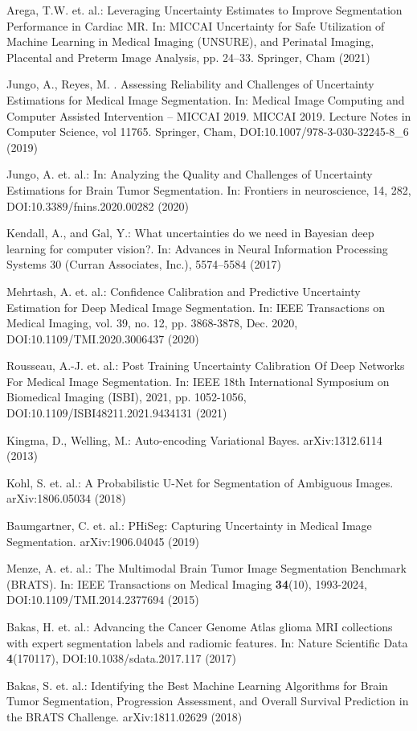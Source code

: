 \documentclass[runningheads]{llncs}
\begin{document}
\begin{thebibliography}{8}
Arega, T.W. et. al.: Leveraging Uncertainty Estimates to Improve Segmentation Performance in Cardiac MR. In: MICCAI Uncertainty for Safe Utilization of Machine Learning in Medical Imaging (UNSURE), and Perinatal Imaging, Placental and Preterm Image Analysis, pp. 24--33. Springer, Cham (2021)

Jungo, A., Reyes, M. . Assessing Reliability and Challenges of Uncertainty Estimations for Medical Image Segmentation. In: Medical Image Computing and Computer Assisted Intervention – MICCAI 2019. MICCAI 2019. Lecture Notes in Computer Science, vol 11765. Springer, Cham, DOI:10.1007/978-3-030-32245-8\_6 (2019)

Jungo, A. et. al.: In: Analyzing the Quality and Challenges of Uncertainty Estimations for Brain Tumor Segmentation. In: Frontiers in neuroscience, 14, 282, DOI:10.3389/fnins.2020.00282 (2020)

Kendall, A., and Gal, Y.: What uncertainties do we need in Bayesian deep
learning for computer vision?. In: Advances in Neural Information Processing
Systems 30 (Curran Associates, Inc.), 5574–5584 (2017)

Mehrtash, A. et. al.: Confidence Calibration and Predictive Uncertainty Estimation for Deep Medical Image Segmentation. In: IEEE Transactions on Medical Imaging, vol. 39, no. 12, pp. 3868-3878, Dec. 2020, DOI:10.1109/TMI.2020.3006437 (2020)

Rousseau, A.-J. et. al.: Post Training Uncertainty Calibration Of Deep Networks For Medical Image Segmentation. In: IEEE 18th International Symposium on Biomedical Imaging (ISBI), 2021, pp. 1052-1056, DOI:10.1109/ISBI48211.2021.9434131 (2021)

Kingma, D., Welling, M.: Auto-encoding Variational Bayes. arXiv:1312.6114 (2013)

Kohl, S. et. al.: A Probabilistic U-Net for Segmentation of Ambiguous Images. arXiv:1806.05034 (2018) 

Baumgartner, C. et. al.: PHiSeg: Capturing Uncertainty in Medical Image Segmentation. arXiv:1906.04045 (2019)

Menze, A. et. al.: The Multimodal Brain Tumor Image Segmentation Benchmark (BRATS). In: IEEE Transactions on Medical Imaging \textbf{34}(10), 1993-2024, DOI:10.1109/TMI.2014.2377694 (2015)

Bakas, H. et. al.: Advancing the Cancer Genome Atlas glioma MRI collections with expert segmentation labels and radiomic features. In: Nature Scientific Data \textbf{4}(170117), DOI:10.1038/sdata.2017.117 (2017)

Bakas, S. et. al.: Identifying the Best Machine Learning Algorithms for Brain Tumor Segmentation, Progression Assessment, and Overall Survival Prediction in the BRATS Challenge. arXiv:1811.02629 (2018)

\end{thebibliography}
\end{document}
